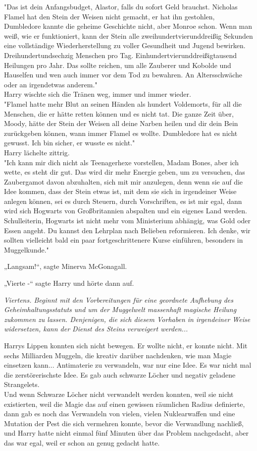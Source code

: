 {"Das ist dein Anfangsbudget, Alastor, falls du sofort Geld brauchst. Nicholas Flamel hat den Stein der Weisen nicht gemacht, er hat ihn gestohlen, Dumbledore kannte die geheime Geschichte nicht, aber Monroe schon. Wenn man weiß, wie er funktioniert, kann der Stein alle zweihundertvierunddreißig Sekunden eine vollständige Wiederherstellung zu voller Gesundheit und Jugend bewirken. Dreihundertundsechzig Menschen pro Tag. Einhundertvierunddreißigtausend Heilungen pro Jahr. Das sollte reichen, um alle Zauberer und Kobolde und Hauselfen und wen auch immer vor dem Tod zu bewahren. An Altersschwäche oder an irgendetwas anderem."\\ Harry wischte sich die Tränen weg, immer und immer wieder.\\ "Flamel hatte mehr Blut an seinen Händen als hundert Voldemorts, für all die Menschen, die er hätte retten können und es nicht tat. Die ganze Zeit über, Moody, hätte der Stein der Weisen all deine Narben heilen und dir dein Bein zurückgeben können, wann immer Flamel es wollte. Dumbledore hat es nicht gewusst. Ich bin sicher, er wusste es nicht."\\ Harry lächelte zittrig.\\ "Ich kann mir dich nicht als Teenagerhexe vorstellen, Madam Bones, aber ich wette, es steht dir gut. Das wird dir mehr Energie geben, um zu versuchen, das Zaubergamot davon abzuhalten, sich mit mir anzulegen, denn wenn sie auf die Idee kommen, dass der Stein etwas ist, mit dem sie sich in irgendeiner Weise anlegen können, sei es durch Steuern, durch Vorschriften, es ist mir egal, dann wird sich Hogwarts von Großbritannien abspalten und ein eigenes Land werden. Schulleiterin, Hogwarts ist nicht mehr vom Ministerium abhängig, was Gold oder Essen angeht. Du kannst den Lehrplan nach Belieben reformieren. Ich denke, wir sollten vielleicht bald ein paar fortgeschrittenere Kurse einführen, besonders in Muggelkunde."

„Langsam!“, sagte Minerva McGonagall.

„Vierte -“ sagte Harry und hörte dann auf.

\emph{Viertens. Beginnt mit den Vorbereitungen für eine geordnete Aufhebung des Geheimhaltungsstatuts und um der Muggelwelt massenhaft magische Heilung zukommen zu lassen. Denjenigen, die sich diesem Vorhaben in irgendeiner Weise widersetzen, kann der Dienst des Steins verweigert werden...}

Harrys Lippen konnten sich nicht bewegen. Er wollte nicht, er konnte nicht. Mit sechs Milliarden Muggeln, die kreativ darüber nachdenken, wie man Magie einsetzen kann... Antimaterie zu verwandeln, war nur eine Idee. Es war nicht mal die zerstörerischste Idee. Es gab auch schwarze Löcher und negativ geladene Strangelets.\\ Und wenn Schwarze Löcher nicht verwandelt werden konnten, weil sie nicht existierten, weil die Magie das auf einen gewissen räumlichen Radius definierte, dann gab es noch das Verwandeln von vielen, vielen Nuklearwaffen und eine Mutation der Pest die sich vermehren konnte, bevor die Verwandlung nachließ, und Harry hatte nicht einmal fünf Minuten über das Problem nachgedacht, aber das war egal, weil er schon an genug gedacht hatte.

}
